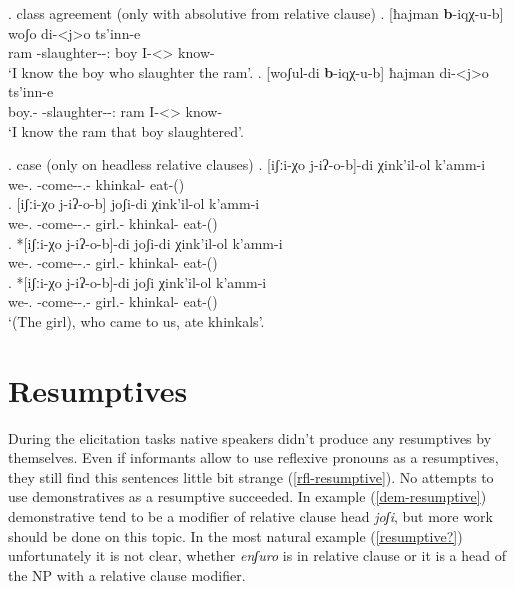 \ex. class agreement (only with absolutive from relative clause)
	\ag. [ħajman \textbf{b}-iqχ-u-b] woʃo di-<j>o ts'inn-e \\
			ram {\Nanf-slaughter-\Pst-\Ptcp:\Pst} boy {I-<\M>\Aff} {know-\Hab}\\
			\glt `I know the boy who slaughter the ram'.
	\bg. [woʃul-di \textbf{b}-iqχ-u-b] ħajman di-<j>o ts'inn-e \\
			{boy.\Obl-\Erg} {\Nanf-slaughter-\Pst-\Ptcp:\Pst} ram {I-<\M>\Aff} {know-\Hab}\\
			\glt `I know the ram that boy slaughtered'.	
			
\ex. case (only on headless relative clauses)
	\ag. [iʃːi-χo j-iʔ-o-b]-di χink'il-ol k'amm-i\\
			{we-\Add.\Lat} {\M-come-\Pst-\Ptcp.\Pst-\Erg} {khinkal-\Pl} {eat-\Pst(\Aor)}\\
	\bg. [iʃːi-χo j-iʔ-o-b] joʃi-di χink'il-ol k'amm-i\\
			{we-\Add.\Lat} {\M-come-\Pst-\Ptcp.\Pst-\Erg} {girl.\Obl-\Erg} {khinkal-\Pl} {eat-\Pst(\Aor)}\\
	\bg. *[iʃːi-χo j-iʔ-o-b]-di joʃi-di χink'il-ol k'amm-i\\
			{we-\Add.\Lat} {\M-come-\Pst-\Ptcp.\Pst-\Erg} {girl.\Obl-\Erg} {khinkal-\Pl} {eat-\Pst(\Aor)}\\
	\bg. *[iʃːi-χo j-iʔ-o-b]-di joʃi χink'il-ol k'amm-i\\
			{we-\Add.\Lat} {\M-come-\Pst-\Ptcp.\Pst-\Erg} {girl.\Obl-\Erg} {khinkal-\Pl} {eat-\Pst(\Aor)}\\
			\glt `(The girl), who came to us, ate khinkals'.

\section{Resumptives}
During the elicitation tasks native speakers didn't produce any resumptives by themselves. Even if informants allow to use reflexive pronouns as a resumptives, they still find this sentences little bit strange (\ref{rfl-resumptive}). No attempts to use demonstratives as a resumptive succeeded. In example (\ref{dem-resumptive}) demonstrative tend to be a modifier of relative clause head \textit{joʃi}, but more work should be done on this topic. In the most natural example (\ref{resumptive?}) unfortunately it is not clear, whether \textit{enʃuro} is in relative clause or it is a head of the NP with a relative clause modifier.

